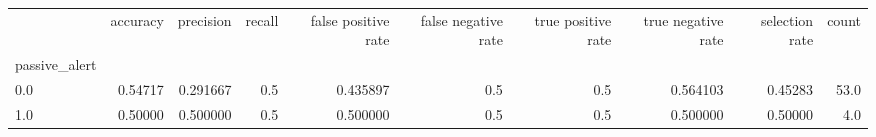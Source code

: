 \begin{tabular}{lrrrrrrrrr}
\toprule
{} &  accuracy &  precision &  recall &  false positive rate &  false negative rate &  true positive rate &  true negative rate &  selection rate &  count \\
passive\_alert &           &            &         &                      &                      &                     &                     &                 &        \\
\midrule
0.0           &   0.54717 &   0.291667 &     0.5 &             0.435897 &                  0.5 &                 0.5 &            0.564103 &         0.45283 &   53.0 \\
1.0           &   0.50000 &   0.500000 &     0.5 &             0.500000 &                  0.5 &                 0.5 &            0.500000 &         0.50000 &    4.0 \\
\bottomrule
\end{tabular}

